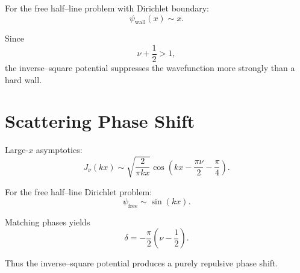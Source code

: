 \documentclass[11pt,a4paper]{article}
\begin{document}
For the free half–line problem with Dirichlet boundary:
\begin{equation}
\psi_{\text{wall}}(x)\sim x.
\end{equation}

Since
\begin{equation}
\nu+\frac{1}{2}>1,
\end{equation}
the inverse–square potential suppresses the wavefunction
more strongly than a hard wall.

\section{Scattering Phase Shift}

Large-$x$ asymptotics:
\begin{equation}
J_\nu(kx)
\sim
\sqrt{\frac{2}{\pi kx}}
\cos\left(
kx-\frac{\pi\nu}{2}-\frac{\pi}{4}
\right).
\end{equation}

For the free half–line Dirichlet problem:
\begin{equation}
\psi_{\text{free}}
\sim
\sin(kx).
\end{equation}

Matching phases yields
\begin{equation}
\delta
=
-\frac{\pi}{2}\left(\nu-\frac{1}{2}\right).
\end{equation}

Thus the inverse–square potential produces
a purely repulsive phase shift.
\end{document}
